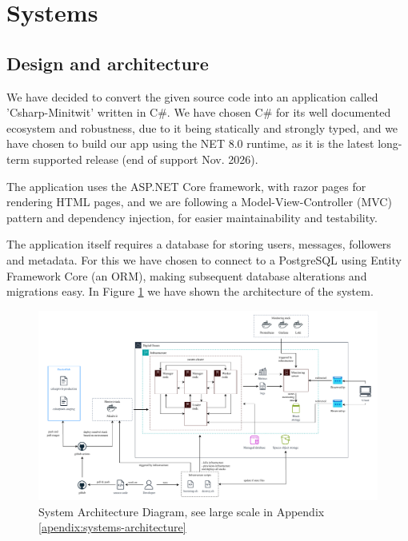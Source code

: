 \section{Systems}
\subsection{Design and architecture} \label{Design of the CSharp-MiniTwit application}
We have decided to convert the given source code into an application called 'Csharp-Minitwit' written in C\#. We have chosen C\# for its well documented ecosystem and robustness, due to it being statically and strongly typed, and we have chosen to build our app using the NET 8.0 runtime, as it is the latest long-term supported release (end of support Nov. 2026)\cite{netcoresupport}.

The application uses the ASP.NET Core framework\cite{aspnetcoreintro2023}, with razor pages for rendering HTML pages, and we are following a Model-View-Controller (MVC) pattern and dependency injection, for easier maintainability and testability.

The application itself requires a database for storing users, messages, followers and metadata. For this we have chosen to connect to a PostgreSQL using Entity Framework Core (an ORM), making subsequent database alterations and migrations easy. In Figure \ref{fig:architecture} we have shown the architecture of the system. 

\begin{figure}[H]
    \centering
    \includegraphics[width=1.0\textwidth]{figures/devops-architecture-architecture_v2.pdf}
    \caption{System Architecture Diagram, see large scale in Appendix \ref{apendix:systems-architecture}}
    \label{fig:architecture}
\end{figure}

